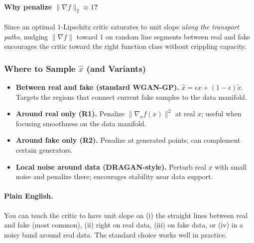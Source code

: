 \documentclass[11pt]{article}
\theoremstyle{remark}
\begin{document}
\paragraph{Why penalize $\|\nabla f\|_2 \!\approx\! 1$?}
Since an optimal $1$-Lipschitz critic saturates to unit slope \emph{along the transport paths}, nudging $\|\nabla f\|$ toward $1$ on random line segments between real and fake encourages the critic toward the right function class without crippling capacity.

\subsubsection{Where to Sample $\hat{x}$ (and Variants)}
\begin{itemize}
\item \textbf{Between real and fake (standard WGAN-GP).} $\hat{x}=\epsilon x+(1-\epsilon)\tilde{x}$. Targets the regions that connect current fake samples to the data manifold.
\item \textbf{Around real only (R1).} Penalize $\|\nabla_x f(x)\|^2$ at real $x$; useful when focusing smoothness on the data manifold.
\item \textbf{Around fake only (R2).} Penalize at generated points; can complement certain generators.
\item \textbf{Local noise around data (DRAGAN-style).} Perturb real $x$ with small noise and penalize there; encourages stability near data support.
\end{itemize}

\paragraph{Plain English.}
You can teach the critic to have unit slope on (i) the straight lines between real and fake (most common), (ii) right on real data, (iii) on fake data, or (iv) in a noisy band around real data. The standard choice works well in practice.
\end{document}
